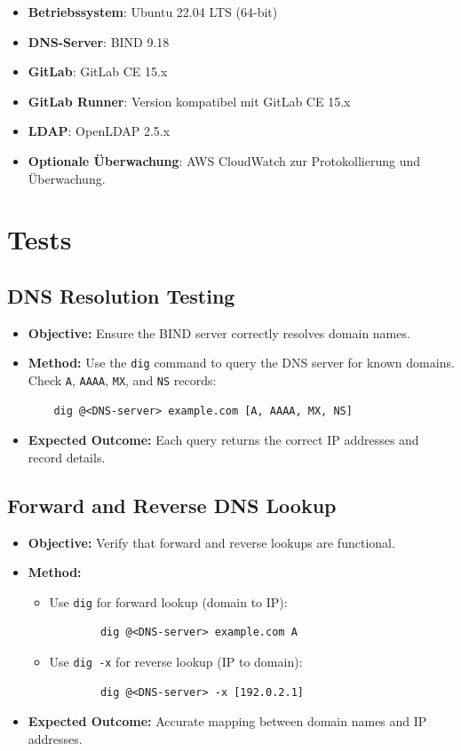 \documentclass[a4paper,12pt]{article}
\begin{document}
\begin{itemize}
    \item \textbf{Betriebssystem}: Ubuntu 22.04 LTS (64-bit)
    \item \textbf{DNS-Server}: BIND 9.18
    \item \textbf{GitLab}: GitLab CE 15.x
    \item \textbf{GitLab Runner}: Version kompatibel mit GitLab CE 15.x
    \item \textbf{LDAP}: OpenLDAP 2.5.x
    \item \textbf{Optionale Überwachung}: AWS CloudWatch zur Protokollierung und Überwachung.
\end{itemize}

\section{Tests}
\subsection*{DNS Resolution Testing}
\begin{itemize}[leftmargin=1.5cm]
    \item \textbf{Objective:} Ensure the BIND server correctly resolves domain names.
    \item \textbf{Method:} Use the \texttt{dig} command to query the DNS server for known domains. Check \texttt{A}, \texttt{AAAA}, \texttt{MX}, and \texttt{NS} records:
    \begin{verbatim}
    dig @<DNS-server> example.com [A, AAAA, MX, NS]
    \end{verbatim}
    \item \textbf{Expected Outcome:} Each query returns the correct IP addresses and record details.
\end{itemize}

\subsection*{Forward and Reverse DNS Lookup}
\begin{itemize}[leftmargin=1.5cm]
    \item \textbf{Objective:} Verify that forward and reverse lookups are functional.
    \item \textbf{Method:}
    \begin{itemize}
        \item Use \texttt{dig} for forward lookup (domain to IP):
        \begin{verbatim}
        dig @<DNS-server> example.com A
        \end{verbatim}
        \item Use \texttt{dig -x} for reverse lookup (IP to domain):
        \begin{verbatim}
        dig @<DNS-server> -x [192.0.2.1]
        \end{verbatim}
    \end{itemize}
    \item \textbf{Expected Outcome:} Accurate mapping between domain names and IP addresses.
\end{itemize}
\end{document}
